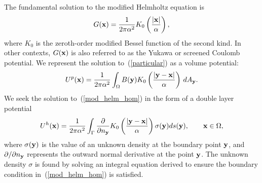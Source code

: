 \documentclass[preprint,12pt]{elsarticle}
\newcommand{\x}{{\bf x}}
\newcommand{\y}{{\bf y}}
\newcommand{\pderiv}[2]{\frac{\partial #1}{\partial #2}}
\newcommand{\eqr}[1]{~(\ref{#1})}
\begin{document}
The fundamental solution to the modified Helmholtz equation is 
\[
  G(\x) = \frac{1}{2\pi\alpha^2} K_0 \left( \frac{|\x|}{\alpha} \right), 
\]
where $K_0$ is the zeroth-order modified Bessel function of the second
kind. In other contexts, $G(\x)$ is also referred to as the Yukawa or screened Coulomb potential. 
We represent the solution to\eqr{particular} as a volume potential: 
\begin{equation}
   U^p(\x) = \frac{1}{2\pi\alpha^2}\int_\Omega B(\y) K_0 \left( \frac{|\y - \x|}{\alpha} \right) \, dA_{\y}. \label{vol_potential}
\end{equation}
We seek the solution to\eqr{mod_helm_hom} in the form of a double layer potential
\begin{equation}
  U^h(\x)=\frac{1}{2\pi\alpha^2}\int_{\Gamma}\pderiv{}{n_{\y}}K_{0}
  \left(\frac{|\y-\x|}{\alpha} \right) \sigma(\y) ds(\y), \qquad \x\in\Omega, \label{eqn:dlp}
\end{equation}
where  $\sigma(\y)$ is the value of an unknown
density at the boundary point $\y$, and $\partial / \partial n_\y$
represents the outward normal derivative at the point $\y$.
The unknown density $\sigma$ is found by solving an integral equation derived to ensure the boundary condition in\eqr{mod_helm_hom} is satisfied. 
\end{document}
